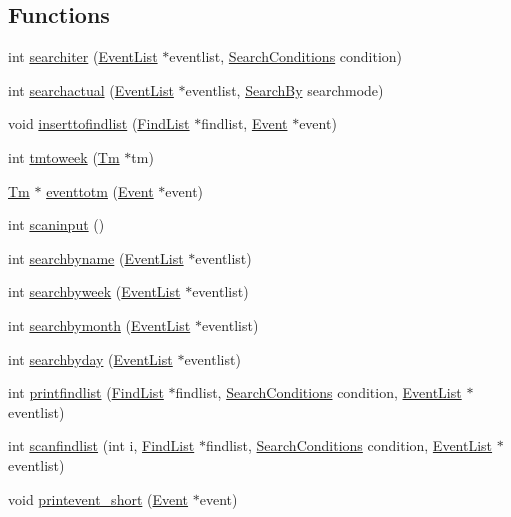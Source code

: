 \subsection*{Functions}
\begin{DoxyCompactItemize}
\item 
int \hyperlink{group__search_ga199722ea7869f598848648238f88d274}{searchiter} (\hyperlink{struct_event_list}{Event\+List} $\ast$eventlist, \hyperlink{struct_search_conditions}{Search\+Conditions} condition)
\item 
int \hyperlink{group__search_ga9a7e3230097d2f97a58082ff6eb864ac}{searchactual} (\hyperlink{struct_event_list}{Event\+List} $\ast$eventlist, \hyperlink{group__search_gaf9df49b17c9441844cafc15064ec50fc}{Search\+By} searchmode)
\item 
void \hyperlink{group__search_gace601ce27f555e73988b2db946d1ca5e}{inserttofindlist} (\hyperlink{struct_find_list}{Find\+List} $\ast$findlist, \hyperlink{struct_event}{Event} $\ast$event)
\item 
int \hyperlink{group__search_ga4e80bfd47c2fef45e9f6f50632544931}{tmtoweek} (\hyperlink{group__list_gaffc453d30a4a6ce81ed778fd04d2d256}{Tm} $\ast$tm)
\item 
\hyperlink{group__list_gaffc453d30a4a6ce81ed778fd04d2d256}{Tm} $\ast$ \hyperlink{group__search_gaa13cd0a956bc531fe1e1329b6aebdef9}{eventtotm} (\hyperlink{struct_event}{Event} $\ast$event)
\item 
int \hyperlink{group__search_ga0ab78ad9b3d9c7fe1975fd416a1f1c5c}{scaninput} ()
\item 
int \hyperlink{group__search_gadaf3bc7221b1fe4f2cffb3aaea00415d}{searchbyname} (\hyperlink{struct_event_list}{Event\+List} $\ast$eventlist)
\item 
int \hyperlink{group__search_ga6b219250779d3af5972611513010a013}{searchbyweek} (\hyperlink{struct_event_list}{Event\+List} $\ast$eventlist)
\item 
int \hyperlink{group__search_gac2a6873263c1a8146c04126b48f8431e}{searchbymonth} (\hyperlink{struct_event_list}{Event\+List} $\ast$eventlist)
\item 
int \hyperlink{group__search_ga5a5f902f17fae2dda3b8ec6bb7e1a6e9}{searchbyday} (\hyperlink{struct_event_list}{Event\+List} $\ast$eventlist)
\item 
int \hyperlink{group__search_ga4fc3c2695bbc6aacac6fcdddbbc2c9ea}{printfindlist} (\hyperlink{struct_find_list}{Find\+List} $\ast$findlist, \hyperlink{struct_search_conditions}{Search\+Conditions} condition, \hyperlink{struct_event_list}{Event\+List} $\ast$eventlist)
\item 
int \hyperlink{group__search_ga70f4e24bc56ccfdd7d63df4a84054538}{scanfindlist} (int i, \hyperlink{struct_find_list}{Find\+List} $\ast$findlist, \hyperlink{struct_search_conditions}{Search\+Conditions} condition, \hyperlink{struct_event_list}{Event\+List} $\ast$eventlist)
\item 
void \hyperlink{group__search_ga2561d96be1299fd3f5730c6d82143709}{printevent\+\_\+short} (\hyperlink{struct_event}{Event} $\ast$event)
\end{DoxyCompactItemize}



